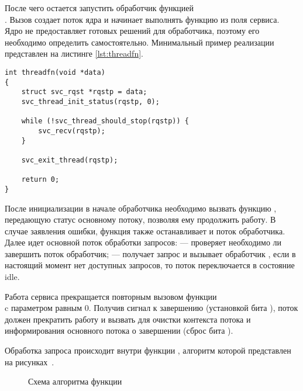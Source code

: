 После чего остается запустить обработчик функцией \\
. Вызов создает поток ядра и начинает выполнять
функцию из поля  сервиса. Ядро не предоставляет готовых
решений для обработчика, поэтому его необходимо определить самостоятельно.
Минимальный пример реализации представлен на листинге \ref{lst:threadfn}.

\begin{lstlisting}[caption={Минимальная реализация функции потока}, label={lst:threadfn}]
int threadfn(void *data)
{
    struct svc_rqst *rqstp = data;
    svc_thread_init_status(rqstp, 0);

    while (!svc_thread_should_stop(rqstp)) {
        svc_recv(rqstp);
    }

    svc_exit_thread(rqstp);

    return 0;
}
\end{lstlisting}

После инициализации в начале обработчика необходимо вызвать функцию
, передающую статус основному потоку, позволяя ему
продолжить работу. В случае заявления ошибки, функция также останавливает и
поток обработчика. Далее идет основной поток обработки запросов:
 --- проверяет необходимо ли завершить поток
обработчик;  --- получает запрос и вызывает обработчик
, если в настоящий момент нет доступных запросов, то поток
переключается в состояние idle.

Работа сервиса прекращается повторным вызовом функции \\
 c параметром  равным 0. Получив сигнал
к завершению (установкой бита ), поток должен прекратить
работу и вызвать  для очистки контекста потока и
информирования основного потока о завершении (сброс бита
).

Обработка запроса происходит внутри функции , алгоритм
которой представлен на
рисунках~.

\vspace*{\fill}
\begin{figure}[!h]
    \centering
    \def\svgwidth{\textwidth}
    
    \caption{Схема алгоритма функции }
    \label{fig:algorithm_svc_process}
\end{figure}
\vfill

